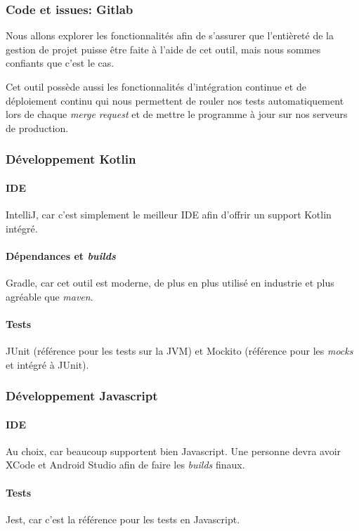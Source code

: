 		\subsubsection{Code et issues: Gitlab}
		Nous allons explorer les fonctionnalités afin de s’assurer que l’entièreté de la gestion de projet puisse être faite à l’aide de cet outil, mais nous sommes confiants que c’est le cas.
		
		Cet outil possède aussi les fonctionnalités d’intégration continue et de déploiement continu qui nous permettent de rouler nos tests automatiquement lors de chaque \emph{merge request} et de mettre le programme à jour sur nos serveurs de production.

		\subsubsection{Développement Kotlin}
		\paragraph{IDE} IntelliJ, car c’est simplement le meilleur IDE afin d'offrir un support Kotlin intégré.
		\paragraph{Dépendances et \emph{builds}} Gradle, car cet outil est moderne, de plus en plus utilisé en industrie et plus agréable que \emph{maven}.
		\paragraph{Tests} JUnit (référence pour les tests sur la JVM) et Mockito (référence pour les \emph{mocks} et intégré à JUnit).

		\subsubsection{Développement Javascript}
		\paragraph{IDE} Au choix, car beaucoup supportent bien Javascript. Une personne devra avoir XCode et Android Studio afin de faire les \emph{builds} finaux. 
		\paragraph{Tests} Jest, car c’est la référence pour les tests en Javascript.
		
